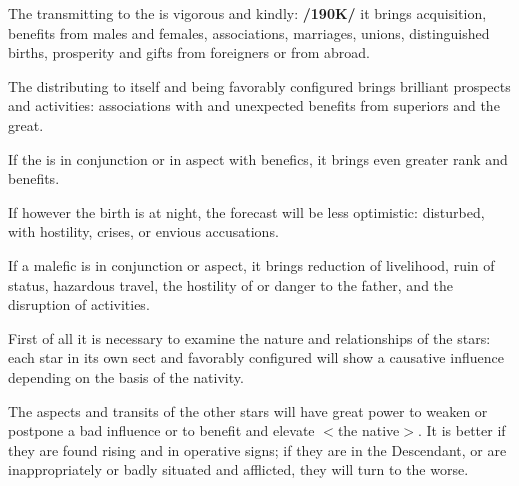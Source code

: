 The \Sun\xspace transmitting to the \Moon\xspace is vigorous and kindly: \textbf{/190K/} it brings acquisition, benefits from males and females, associations, marriages, unions, distinguished births, prosperity and gifts from foreigners or from abroad.

The \Sun\xspace distributing to itself and being favorably configured brings brilliant prospects and activities:
associations with and unexpected benefits from superiors and the great. 

If the \Sun\xspace is in conjunction or in aspect with benefics, it brings even greater rank and benefits. 

If however the birth is at night, the forecast will be less optimistic: disturbed, with hostility, crises, or envious accusations. 

If a malefic is in conjunction or aspect, it brings reduction of livelihood, ruin of status, hazardous travel, the hostility of or danger to the father, and the disruption of activities.

First of all it is necessary to examine the nature and relationships of the stars: each star in its own sect and favorably configured will show a causative influence depending on the basis of the nativity. 

The aspects and transits of the other stars will have great power to weaken or postpone a bad influence or to benefit and elevate $<$the native$>$. It is better if they are found rising and in operative signs; if they are in the Descendant, or are inappropriately or badly situated and afflicted, they will turn to the worse.

\newpage